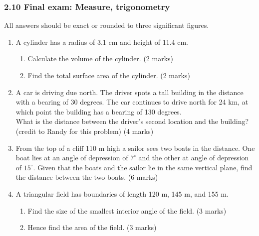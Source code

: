 \documentclass[12pt, twoside]{article}
\begin{document}
\subsubsection*{2.10 Final exam: Measure, trigonometry}
All answers should be exact or rounded to three significant figures.

\begin{enumerate}

\item A cylinder has a radius of 3.1 cm and height of 11.4 cm. 
  \begin{enumerate}
    \item Calculate the volume of the cylinder. \hfill (2 marks)
    \item Find the total surface area of the cylinder. \hfill (2 marks)
  \end{enumerate}

\item A car is driving due north. The driver spots a tall building in the distance with a bearing of 30 degrees. The car continues to drive north for 24 km, at which point the building has a bearing of 130 degrees. \\[0.25cm]
What is the distance between the driver's second location and the building? \\
(credit to Randy for this problem) \hfill (4 marks)
\begin{center}
\end{center}

\item From the top of a cliff 110 m high a sailor sees two boats in the distance. One boat lies at an angle of depression of $7^\circ$ and the other at angle of depression of $15^\circ$. Given that the boats and the sailor lie in the same vertical plane, find the distance between the two boats. \hfill (6 marks)

\item A triangular field has boundaries of length 120 m, 145 m, and 155 m. 
\begin{enumerate}
  \item Find the size of the smallest interior angle of the field. \hfill (3 marks)
  \item Hence find the area of the field. \hfill (3 marks)
\end{enumerate}


\end{enumerate}
\end{document}
